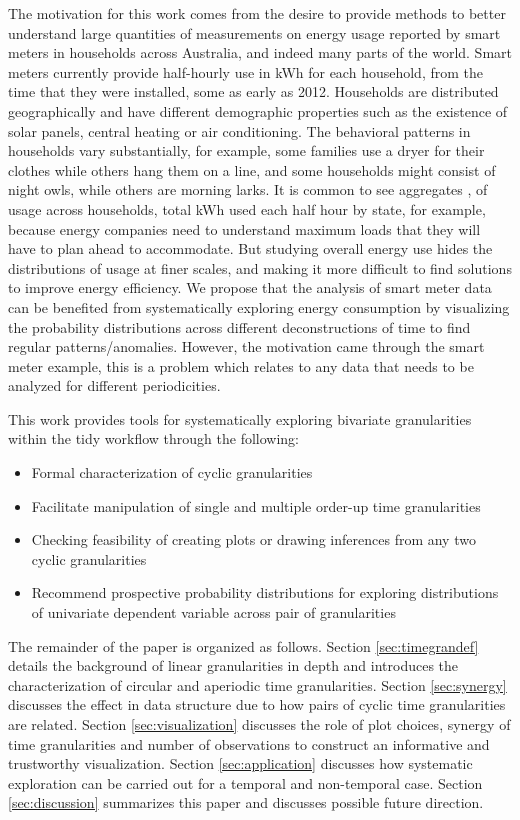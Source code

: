 \documentclass[12pt]{article}
\begin{document}
The motivation for this work comes from the desire to provide methods to
better understand large quantities of measurements on energy usage
reported by smart meters in households across Australia, and indeed many
parts of the world. Smart meters currently provide half-hourly use in
kWh for each household, from the time that they were installed, some as
early as 2012. Households are distributed geographically and have
different demographic properties such as the existence of solar panels,
central heating or air conditioning. The behavioral patterns in
households vary substantially, for example, some families use a dryer
for their clothes while others hang them on a line, and some households
might consist of night owls, while others are morning larks. It is
common to see aggregates \citep{2012-la}, of usage across households,
total kWh used each half hour by state, for example, because energy
companies need to understand maximum loads that they will have to plan
ahead to accommodate. But studying overall energy use hides the
distributions of usage at finer scales, and making it more difficult to
find solutions to improve energy efficiency. We propose that the
analysis of smart meter data can be benefited from systematically
exploring energy consumption by visualizing the probability
distributions across different deconstructions of time to find regular
patterns/anomalies. However, the motivation came through the smart meter
example, this is a problem which relates to any data that needs to be
analyzed for different periodicities.

This work provides tools for systematically exploring bivariate
granularities within the tidy workflow through the following:

\begin{itemize}
\item
  Formal characterization of cyclic granularities
\item
  Facilitate manipulation of single and multiple order-up time
  granularities
\item
  Checking feasibility of creating plots or drawing inferences from any
  two cyclic granularities
\item
  Recommend prospective probability distributions for exploring
  distributions of univariate dependent variable across pair of
  granularities
\end{itemize}

The remainder of the paper is organized as follows. Section
\ref{sec:timegrandef} details the background of linear granularities in
depth and introduces the characterization of circular and aperiodic time
granularities. Section \ref{sec:synergy} discusses the effect in data
structure due to how pairs of cyclic time granularities are related.
Section \ref{sec:visualization} discusses the role of plot choices,
synergy of time granularities and number of observations to construct an
informative and trustworthy visualization. Section \ref{sec:application}
discusses how systematic exploration can be carried out for a temporal
and non-temporal case. Section \ref{sec:discussion} summarizes this
paper and discusses possible future direction.
\end{document}
